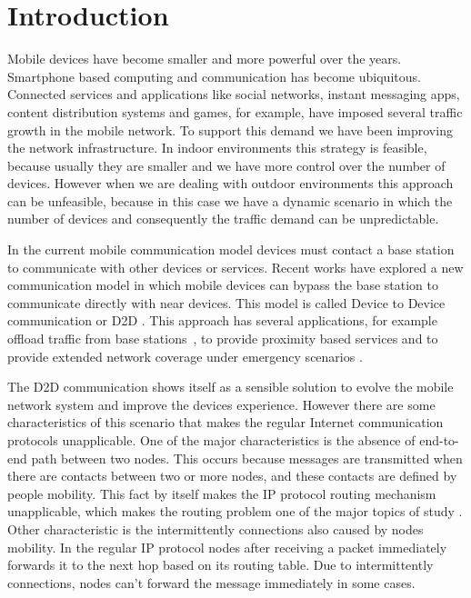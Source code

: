 \chapter{Introduction}
\label{ch:Introduction}

Mobile devices have become smaller and more powerful over the years. Smartphone based computing and communication has become ubiquitous.
Connected services and applications like social networks, instant messaging apps, content distribution systems and games, for example, have imposed several traffic growth in the mobile network.
To support this demand we have been improving the network infrastructure. In indoor environments this strategy is feasible, because usually
they are smaller and we have more control over the number of devices. However when we are dealing with outdoor environments this approach can be
unfeasible, because in this case we have a dynamic scenario in which the number of devices and consequently the traffic demand can be unpredictable.

In the current mobile communication model devices must contact a base station to communicate with other devices or services.
Recent works have explored a new communication model in which mobile devices can bypass the base station to communicate directly
with near devices. This model is called Device to Device communication or D2D \cite{yang2013solving}. This approach has several applications,
for example offload traffic from base stations~\cite{yang2013solving,nunes2016leveraging,aijaz2013survey,pyattaev2013proximity,andreev2014cellular,bastug2014living},
to provide proximity based services \cite{lin2014overview} and  to provide extended network coverage under emergency scenarios \cite{babun2015multi}.

The D2D communication shows itself as a sensible solution to evolve the mobile network system and improve the devices experience. However there
are some characteristics of this scenario that makes the regular Internet communication protocols unapplicable. One of the major characteristics is
the absence of end-to-end path between two nodes. This occurs because messages are transmitted when there are contacts between two or more nodes, and
these contacts are defined by people mobility. This fact by itself makes the IP protocol routing mechanism unapplicable, which makes the routing problem
one of the major topics of study \cite{misra2016opportunistic}. Other characteristic is the intermittently connections also caused by nodes mobility. In the regular IP protocol nodes
after receiving a packet immediately forwards it to the next hop based on its routing table. Due to intermittently connections, nodes can't forward the message
immediately in some cases.

